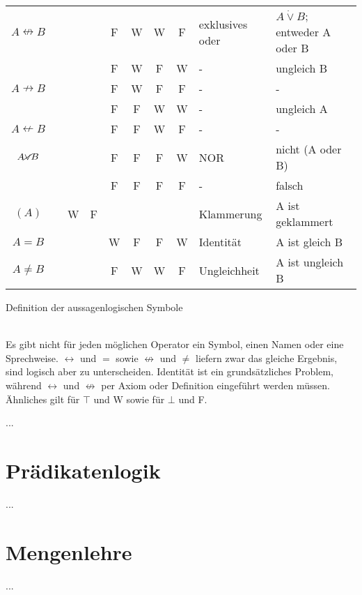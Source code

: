 \documentclass[english,ngerman,parskip=half,headsepline,footsepline]{scrreprt}
\begin{document}
\begin{threeparttable}
\begin{tabular}{@{}c|c:cc:cccc|l:l|}
			$A\nleftrightarrow B$ & & & &F&W&W&F& exklusives oder & $A\dot{\vee}B$; entweder A oder B\\
			                      & & & &F&W&F&W& - & ungleich B\\
			$A\nrightarrow B$     & & & &F&W&F&F& - & -\\
						\hdashline[2pt/2pt]
			                      & & & &F&F&W&W& - & ungleich A\\
			$A\nleftarrow B$      & & & &F&F&W&F& - & -\\
			$A\cancel{\vee}B$     & & & &F&F&F&W& NOR & nicht (A oder B) \\
			                      & & & &F&F&F&F& - & falsch\\
			\hdashline[2pt/2pt]
			$(A)$                 & &W&F& & & & & Klammerung & A ist geklammert \\
			$A=B$                 & & & &W&F&F&W& Identität & A ist gleich B \\
			$A\ne B$              & & & &F&W&W&F& Ungleichheit & A ist ungleich B \\
			\hline 
		\end{tabular}
		\caption{Definition der aussagenlogischen Symbole}
		\label{tab:aussagenlogische Symbole}
	\end{threeparttable}\\

	Es gibt nicht für jeden möglichen Operator ein Symbol, einen Namen oder eine Sprechweise. $\leftrightarrow$ und $=$ sowie $\nleftrightarrow$ und $\ne$ liefern zwar das gleiche Ergebnis, sind logisch aber zu unterscheiden. Identität ist ein grundsätzliches Problem, während $\leftrightarrow$ und $\nleftrightarrow$ per Axiom oder Definition eingeführt werden müssen. Ähnliches gilt für $\top$ und W sowie für $\bot$ und F.

	\par ... %
	
	\section{Prädikatenlogik}
	\label{Prädikatenlogik}
	
	... %
	
	\section{Mengenlehre}
	\label{Mengenlehre}
	
	... %
	
\end{document}
